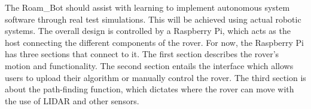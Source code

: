 The Roam\_Bot should assist with learning to implement autonomous system software through real test simulations. This will be achieved using actual robotic systems. The overall design is controlled by a Raspberry Pi, which acts as the host connecting the different components of the rover. For now, the Raspberry Pi has three sections that connect to it. The first section describes the rover's motion and functionality. The second section entails the interface which allows users to upload their algorithm or manually control the rover. The third section is about the path-finding function, which dictates where the rover can move with the use of LIDAR and other sensors.